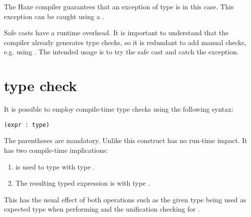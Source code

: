 The Haxe compiler guarantees that an exception of type  is  in this case. This exception can be caught using a .

Safe casts have a runtime overhead. It is important to understand that the compiler already generates type checks, so it is redundant to add manual checks, e.g. using . The intended usage is to try the safe cast and catch the  exception.


\section{type check}
\label{expression-type-check}

It is possible to employ compile-time type checks using the following syntax:

\begin{lstlisting}
(expr : type)
\end{lstlisting}

The parentheses are mandatory. Unlike  this construct has no run-time impact. It has two compile-time implications:

\begin{enumerate}
\item {} is used to type  with type .
\item The resulting typed expression is  with type .
\end{enumerate}

This has the usual effect of both operations such as the given type being used as expected type when performing  and the unification checking for .
